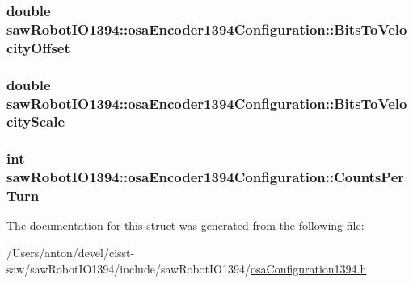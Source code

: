 \subsubsection[{Bits\+To\+Velocity\+Offset}]{\setlength{\rightskip}{0pt plus 5cm}double saw\+Robot\+I\+O1394\+::osa\+Encoder1394\+Configuration\+::\+Bits\+To\+Velocity\+Offset}\label{structsaw_robot_i_o1394_1_1osa_encoder1394_configuration_a63b455fc6fa30208293ab342efc83811}
\hypertarget{structsaw_robot_i_o1394_1_1osa_encoder1394_configuration_a746ed967a0547da052f09058b6c203ed}{}
\subsubsection[{Bits\+To\+Velocity\+Scale}]{\setlength{\rightskip}{0pt plus 5cm}double saw\+Robot\+I\+O1394\+::osa\+Encoder1394\+Configuration\+::\+Bits\+To\+Velocity\+Scale}\label{structsaw_robot_i_o1394_1_1osa_encoder1394_configuration_a746ed967a0547da052f09058b6c203ed}
\hypertarget{structsaw_robot_i_o1394_1_1osa_encoder1394_configuration_afd57b4ae73ec773c21015e4f7fbd33f9}{}
\subsubsection[{Counts\+Per\+Turn}]{\setlength{\rightskip}{0pt plus 5cm}int saw\+Robot\+I\+O1394\+::osa\+Encoder1394\+Configuration\+::\+Counts\+Per\+Turn}\label{structsaw_robot_i_o1394_1_1osa_encoder1394_configuration_afd57b4ae73ec773c21015e4f7fbd33f9}


The documentation for this struct was generated from the following file\+:\begin{DoxyCompactItemize}
\item 
/\+Users/anton/devel/cisst-\/saw/saw\+Robot\+I\+O1394/include/saw\+Robot\+I\+O1394/\hyperlink{osa_configuration1394_8h}{osa\+Configuration1394.\+h}\end{DoxyCompactItemize}
